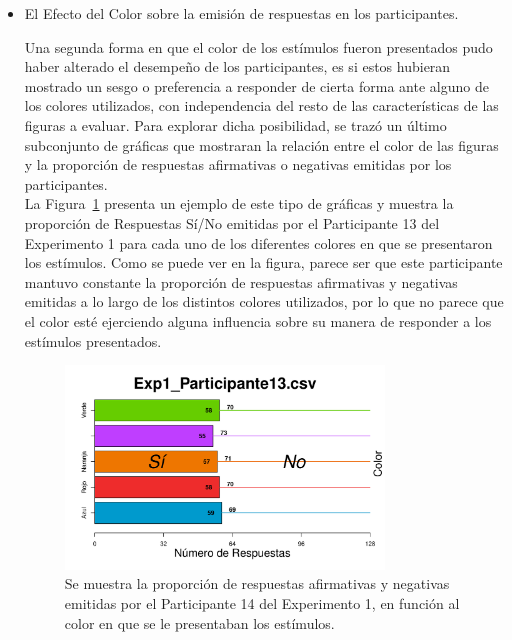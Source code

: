 \begin{itemize}

\item El Efecto del Color sobre la emisión de respuestas en los participantes.

Una segunda forma en que el color de los estímulos fueron presentados pudo haber alterado el desempeño de los participantes, es si estos hubieran mostrado un sesgo o preferencia a responder de cierta forma ante alguno de los colores utilizados, con independencia del resto de las características de las figuras a evaluar. Para explorar dicha posibilidad, se trazó un último subconjunto de gráficas que mostraran la relación entre el color de las figuras y la proporción de respuestas afirmativas o negativas emitidas por los participantes.\\

La Figura~\ref{fig:BiasCol_E1_P13} presenta un ejemplo de este tipo de gráficas y muestra la proporción de Respuestas Sí/No emitidas por el Participante 13 del Experimento 1 para cada uno de los diferentes colores en que se presentaron los estímulos. Como se puede ver en la figura, parece ser que este participante mantuvo constante la proporción de respuestas afirmativas y negativas emitidas a lo largo de los distintos colores utilizados, por lo que no parece que el color esté ejerciendo alguna influencia sobre su manera de responder a los estímulos presentados.\\

\begin{figure}[th]
\centering
\includegraphics[width=0.80\textwidth]{Figures/BiasColor_Exp1_P13}
\caption[Proporción de Respuestas Sí/No por color; Ejemplo]{Se muestra la proporción de respuestas afirmativas y negativas emitidas por el Participante 14 del Experimento 1, en función al color en que se le presentaban los estímulos.}
\label{fig:BiasCol_E1_P13}
\end{figure}


\end{itemize}

